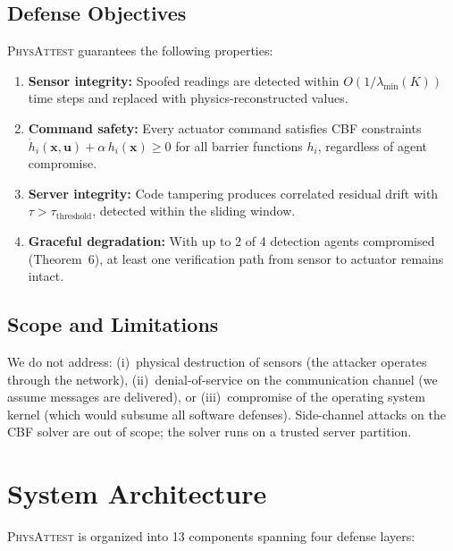 \documentclass[journal]{IEEEtran}
\newcommand{\physattest}{\textsc{PhysAttest}}
\begin{document}
\subsection{Defense Objectives}

\physattest{} guarantees the following properties:

\begin{enumerate}[leftmargin=*]
\item \textbf{Sensor integrity:} Spoofed readings are detected within $O(1/\lambda_{\min}(K))$ time steps and replaced with physics-reconstructed values.

\item \textbf{Command safety:} Every actuator command satisfies CBF constraints $\dot{h}_i(\bm{x}, \bm{u}) + \alpha \, h_i(\bm{x}) \ge 0$ for all barrier functions $h_i$, regardless of agent compromise.

\item \textbf{Server integrity:} Code tampering produces correlated residual drift with $\tau > \tau_{\text{threshold}}$, detected within the sliding window.

\item \textbf{Graceful degradation:} With up to 2 of 4 detection agents compromised (Theorem~6), at least one verification path from sensor to actuator remains intact.
\end{enumerate}

\subsection{Scope and Limitations}

We do not address: (i)~physical destruction of sensors (the attacker operates through the network), (ii)~denial-of-service on the communication channel (we assume messages are delivered), or (iii)~compromise of the operating system kernel (which would subsume all software defenses). Side-channel attacks on the CBF solver are out of scope; the solver runs on a trusted server partition.


\section{System Architecture}
\label{sec:architecture}

\physattest{} is organized into 13 components spanning four defense layers:
\end{document}

